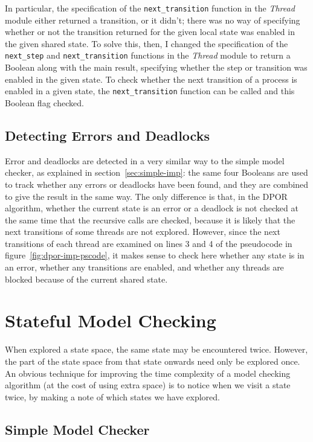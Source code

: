 \documentclass[12pt,a4paper,twoside,openright]{report}
\begin{document}
In particular, the specification of the
\texttt{next\_transition} function in the
\textit{Thread} module either returned
a transition, or it didn't; there was
no way of specifying whether or not
the transition returned for the
given local state was enabled in the
given shared state. To solve this,
then, I changed the specification
of the \texttt{next\_step} and
\texttt{next\_transition} functions
in the \textit{Thread} module to
return a Boolean along with the
main result, specifying whether
the step or transition was enabled
in the given state. To check whether
the next transition of a process is
enabled in a given state, the
\texttt{next\_transition} function
can be called and this Boolean flag
checked.

\subsection{Detecting Errors and Deadlocks}
\label{sec:dpor-imp-detecting}

Error and deadlocks are detected in a
very similar way to the simple model
checker, as explained in
section~\ref{sec:simple-imp}: the same
four Booleans are used to track whether
any errors or deadlocks have been found,
and they are combined to give the
result in the same way. The only
difference is that, in the DPOR
algorithm, whether the current
state is an error or a deadlock
is not checked at the same time
that the recursive calls are
checked, because it is likely that
the next transitions of some
threads are not explored. However,
since the next transitions of
each thread are examined on
lines 3 and 4 of the pseudocode
in figure~\ref{fig:dpor-imp-pscode},
it makes sense to check here
whether any state is in an error,
whether any transitions are enabled,
and whether any threads are blocked
because of the current shared state.

\section{Stateful Model Checking}
When explored a state space, the same state may be
encountered twice. However, the part of the state
space from that state onwards need only be explored
once. An obvious technique for improving the
time complexity of a model checking algorithm
(at the cost of using extra space) is to notice
when we visit a state twice, by making a note
of which states we have explored.

\subsection{Simple Model Checker}
\end{document}
